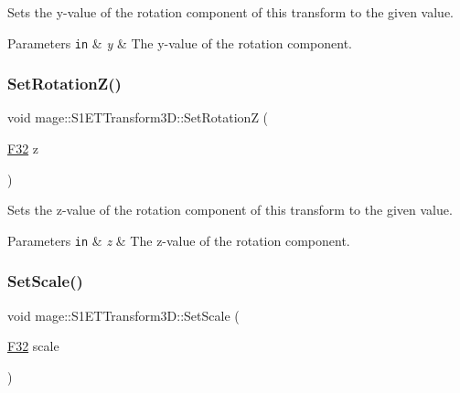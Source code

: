 Sets the y-\/value of the rotation component of this transform to the given value.


\begin{DoxyParams}[1]{Parameters}
\mbox{\tt in}  & {\em y} & The y-\/value of the rotation component. \\
\hline
\end{DoxyParams}
\mbox{\label{classmage_1_1_s1_e_t_transform3_d_ac3ec913efbd37e0b0235b39dabe1322d}} 
\subsubsection{\texorpdfstring{Set\+Rotation\+Z()}{SetRotationZ()}}
{\footnotesize\ttfamily void mage\+::\+S1\+E\+T\+Transform3\+D\+::\+Set\+RotationZ (\begin{DoxyParamCaption}\item[{\mbox{\hyperlink{namespacemage_aa97e833b45f06d60a0a9c4fc22ae02c0}{F32}}}]{z }\end{DoxyParamCaption})\hspace{0.3cm}{\ttfamily [noexcept]}}

Sets the z-\/value of the rotation component of this transform to the given value.


\begin{DoxyParams}[1]{Parameters}
\mbox{\tt in}  & {\em z} & The z-\/value of the rotation component. \\
\hline
\end{DoxyParams}
\mbox{\label{classmage_1_1_s1_e_t_transform3_d_a5ae15331e6896a1192ebcbaa567fb9ef}} 
\subsubsection{\texorpdfstring{Set\+Scale()}{SetScale()}}
{\footnotesize\ttfamily void mage\+::\+S1\+E\+T\+Transform3\+D\+::\+Set\+Scale (\begin{DoxyParamCaption}\item[{\mbox{\hyperlink{namespacemage_aa97e833b45f06d60a0a9c4fc22ae02c0}{F32}}}]{scale }\end{DoxyParamCaption})\hspace{0.3cm}{\ttfamily [noexcept]}}

